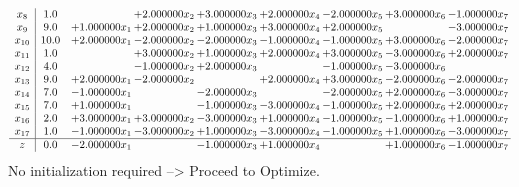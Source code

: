 \documentclass[10pt]{article}
\begin{document}
\[\begin{array}{c| c c@{\hskip 2pt} c@{\hskip 2pt} c@{\hskip 2pt} c@{\hskip 2pt} c@{\hskip 2pt} c@{\hskip 2pt} c@{\hskip 2pt} }
 x_{8}   &  1.0  &   & + 2.000000 x_{2} & + 3.000000 x_{3} & + 2.000000 x_{4} & -2.000000 x_{5} & + 3.000000 x_{6} & -1.000000 x_{7}\\
 x_{9}   &  9.0 & + 1.000000 x_{1} & + 2.000000 x_{2} & + 1.000000 x_{3} & + 3.000000 x_{4} & + 2.000000 x_{5} &   & -3.000000 x_{7}\\
 x_{10}   &  10.0 & + 2.000000 x_{1} & -2.000000 x_{2} & -2.000000 x_{3} & -1.000000 x_{4} & -1.000000 x_{5} & + 3.000000 x_{6} & -2.000000 x_{7}\\
 x_{11}   &  1.0  &   & + 3.000000 x_{2} & + 1.000000 x_{3} & + 2.000000 x_{4} & + 3.000000 x_{5} & -3.000000 x_{6} & + 2.000000 x_{7}\\
 x_{12}   &  4.0  &   & -1.000000 x_{2} & + 2.000000 x_{3} &   & -1.000000 x_{5} & -3.000000 x_{6} &   \\
 x_{13}   &  9.0 & + 2.000000 x_{1} & -2.000000 x_{2} &   & + 2.000000 x_{4} & + 3.000000 x_{5} & -2.000000 x_{6} & -2.000000 x_{7}\\
 x_{14}   &  7.0 & -1.000000 x_{1} &   & -2.000000 x_{3} &   & -2.000000 x_{5} & + 2.000000 x_{6} & -3.000000 x_{7}\\
 x_{15}   &  7.0 & + 1.000000 x_{1} &   & -1.000000 x_{3} & -3.000000 x_{4} & -1.000000 x_{5} & + 2.000000 x_{6} & + 2.000000 x_{7}\\
 x_{16}   &  2.0 & + 3.000000 x_{1} & + 3.000000 x_{2} & -3.000000 x_{3} & + 1.000000 x_{4} & -1.000000 x_{5} & -1.000000 x_{6} & + 1.000000 x_{7}\\
 x_{17}   &  1.0 & -1.000000 x_{1} & -3.000000 x_{2} & + 1.000000 x_{3} & -3.000000 x_{4} & -1.000000 x_{5} & + 1.000000 x_{6} & -3.000000 x_{7}\\
\hline
z    &  0.0 & -2.000000 x_{1} &   & -1.000000 x_{3} & + 1.000000 x_{4} &   & + 1.000000 x_{6} & -1.000000 x_{7}\\
\end{array}\]
No initialization required --> Proceed to Optimize. 
\end{document}
